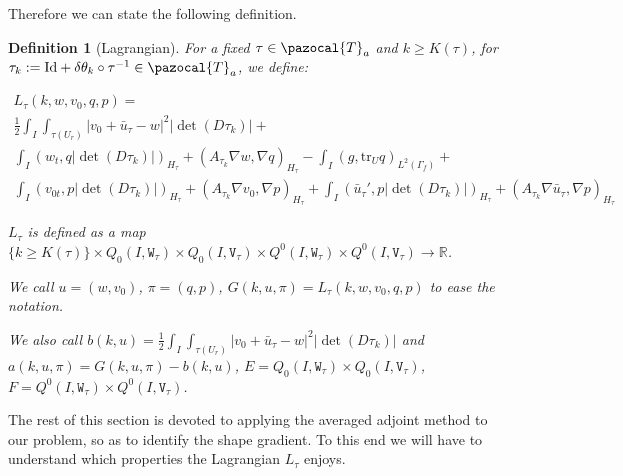 \documentclass[english,a4paper,9pt,oneside]{scrbook}	%
\theoremstyle{break}
\newtheorem{defn}[equation]{Definition}
\theoremstyle{remark}
\newcommand{\mR}{\mathbb{R}}
\newcommand{\tr}{\text{tr}}
\newcommand{\cT}{\pazocal{T}}
\newcommand{\id}{\text{Id}}
\newcommand{\te}{\theta}
\newcommand{\tw}[1]{\texttt{#1}}
\begin{document}
Therefore we can state the following definition.

\begin{defn}[Lagrangian]

For a fixed $\tau \in \cT_a$ and  $k\geq K(\tau)$, for $\tau_k:=\id+\delta\te_k \circ \tau^{-1} \in \cT_a$, we define:

\begin{align*}
L_\tau(k,w,v_0,q,p) = \\
\frac{1}{2}\int_I \int_{\tau(U_r)}|v_0+\bar{u}_\tau - w|^2|\det(D\tau_k)|+\\
\int_I ( w_t , q |\det(D\tau_k)|)_{H_\tau}+ (A_{\tau_k}\nabla w, \nabla q)_{H_\tau} -\int_I(g,\tr_{U} q)_{L^2(\Gamma_f)} +\\ \int_I (v_{0t},p |\det(D\tau_k)|)_{H_\tau} + (A_{\tau_k} \nabla v_0, \nabla p)_{H_\tau}+\int_I(\bar{u}_\tau',p|\det(D\tau_k)|)_{H_\tau}+(A_{\tau_k} \nabla \bar{u}_\tau , \nabla p)_{H_\tau}
\end{align*}

$L_\tau$ is defined as a map $\{k\geq K(\tau)\}\times Q_0(I, \tw{W}_\tau)\times Q_0(I,\tw{V}_\tau)\times Q^0(I, \tw{W}_\tau)\times Q^0(I, \tw{V}_\tau)\rightarrow \mR$.

We call $u = (w,v_0)$, $\pi = (q,p)$, $G(k,u,\pi) = L_\tau(k,w,v_0,q,p)$ to ease the notation.

We also call $b(k, u) = \frac{1}{2}\int_I \int_{\tau(U_r)}|v_0+\bar{u}_\tau - w|^2|\det(D\tau_k)|$ and $a(k, u,\pi) = G(k,u,\pi)-b(k, u)$, $E = Q_0(I, \tw{W}_\tau)\times Q_0(I,\tw{V}_\tau)$, $F=Q^0(I, \tw{W}_\tau)\times Q^0(I, \tw{V}_\tau)$.

\end{defn}

The rest of this section is devoted to applying the averaged adjoint method \cite{avg_adj} to our problem, so as to identify the shape gradient. To this end we will have to understand which properties the Lagrangian $L_\tau $ enjoys.
\end{document}
